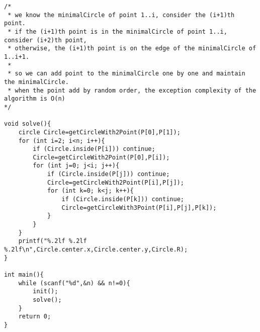 \begin{verbatim}
/*
 * we know the minimalCircle of point 1..i, consider the (i+1)th point.
 * if the (i+1)th point is in the minimalCircle of point 1..i, consider (i+2)th point,
 * otherwise, the (i+1)th point is on the edge of the minimalCircle of 1..i+1.
 *
 * so we can add point to the minimalCircle one by one and maintain the minimalCircle.
 * when the point add by random order, the exception complexity of the algorithm is O(n)
*/

void solve(){
    circle Circle=getCircleWith2Point(P[0],P[1]);
    for (int i=2; i<n; i++){
        if (Circle.inside(P[i])) continue;
        Circle=getCircleWith2Point(P[0],P[i]);
        for (int j=0; j<i; j++){
            if (Circle.inside(P[j])) continue;
            Circle=getCircleWith2Point(P[i],P[j]);
            for (int k=0; k<j; k++){
                if (Circle.inside(P[k])) continue;
                Circle=getCircleWith3Point(P[i],P[j],P[k]);
            }
        }
    }
    printf("%.2lf %.2lf %.2lf\n",Circle.center.x,Circle.center.y,Circle.R);
}

int main(){
    while (scanf("%d",&n) && n!=0){
        init();
        solve();
    }
    return 0;
}
\end{verbatim}
